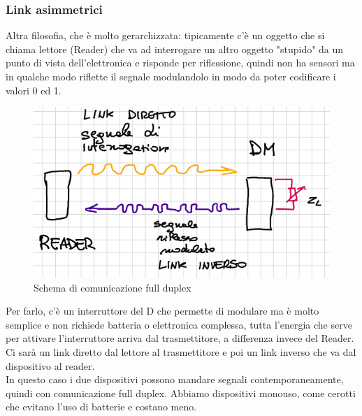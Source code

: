 \documentclass[oneside, 12pt]{extbook}
\begin{document}
\subsubsection{Link asimmetrici}
Altra filosofia, che è molto gerarchizzata: tipicamente c'è un oggetto che si chiama lettore (Reader) che va ad interrogare un altro oggetto "stupido" da un punto di vista dell'elettronica e risponde per riflessione, quindi non ha sensori ma in qualche modo riflette il segnale modulandolo in modo da poter codificare i valori 0 ed 1. 
\begin{figure}
	\includegraphics[scale=0.5]{immagini/com_fulld.png}
	\caption{Schema di comunicazione full duplex}
\end{figure}
Per farlo, c'è un interruttore del D che permette di modulare ma è molto semplice e non richiede batteria o elettronica complessa, tutta l'energia che serve per attivare l'interruttore arriva dal trasmettitore, a differenza invece del Reader.\\Ci sarà un link diretto dal lettore al trasmettitore e poi un link inverso che va dal dispositivo al reader.\\In questo caso i due dispositivi possono mandare segnali contemporaneamente, quindi con comunicazione full duplex. Abbiamo dispositivi monouso, come cerotti che evitano l'uso di batterie e costano meno.
\end{document}
